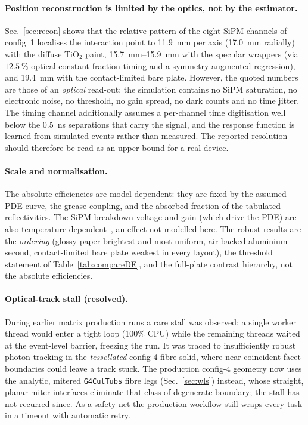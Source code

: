 \documentclass[11pt,a4paper]{article}
\begin{document}
\paragraph{Position reconstruction is limited by the optics, not by the estimator.}
Sec.~\ref{sec:recon} shows that the relative pattern of the eight SiPM
channels of config~1 localises the interaction point to
\SI{11.9}{\milli\meter} per axis (\SI{17.0}{\milli\meter} radially) with the
diffuse TiO$_2$ paint, \SI{15.7}{\milli\meter}--\SI{15.9}{\milli\meter} with
the specular wrappers (via $\SI{12.5}{\percent}$ optical constant-fraction
timing and a symmetry-augmented regression), and \SI{19.4}{\milli\meter} with the
contact-limited bare plate.  However, the quoted numbers are those of an
\emph{optical} read-out: the simulation contains no SiPM
saturation, no electronic noise, no threshold, no gain spread, no dark counts
and no time jitter.  The timing channel additionally assumes a per-channel
time digitisation well below the \SI{0.5}{\nano\second} separations that carry
the signal, and the response function is learned from simulated events rather
than measured.  The reported resolution should therefore be read as an upper
bound for a real device.

\paragraph{Scale and normalisation.}
The absolute efficiencies are model-dependent: they are fixed by the assumed
PDE curve, the grease coupling, and the absorbed fraction of the tabulated
reflectivities. The SiPM breakdown voltage and gain (which drive the PDE) are
also temperature-dependent~\cite{Anfimov2021}, an effect not modelled here. The
robust results are the \emph{ordering} (glossy paper brightest and most uniform,
air-backed aluminium second, contact-limited bare plate weakest in every
layout), the
threshold statement of Table~\ref{tab:compareDE}, and the full-plate contrast
hierarchy, not the absolute efficiencies.

\paragraph{Optical-track stall (resolved).}
During earlier matrix production runs a rare stall was observed: a single worker
thread would enter a tight loop (100\% CPU) while the remaining threads waited at
the event-level barrier, freezing the run. It was traced to insufficiently
robust photon tracking in the \emph{tessellated} config-4 fibre solid, where
near-coincident facet boundaries could leave a track stuck. The production
config-4 geometry now uses the analytic, mitered \texttt{G4CutTubs} fibre legs
(Sec.~\ref{sec:wls}) instead, whose straight, planar miter interfaces eliminate
that class of degenerate boundary; the stall has not recurred since. As a safety
net the production workflow still wraps every task in a timeout with automatic
retry.
\end{document}
